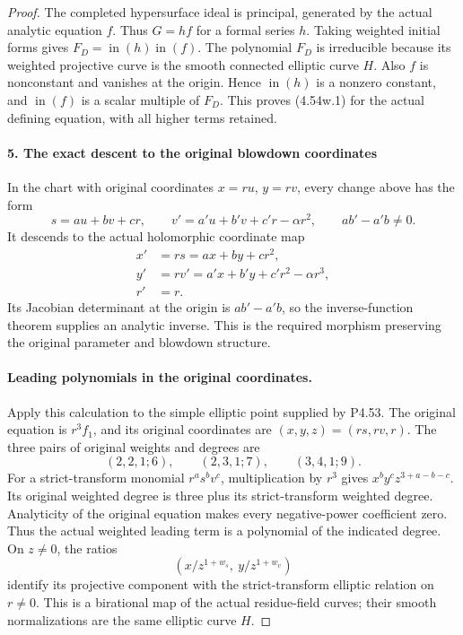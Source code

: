 \begin{proof}
The completed hypersurface ideal is principal, generated by
the actual analytic equation \(f\). Thus \(G=h f\) for
a formal series \(h\). Taking weighted initial forms gives
\(F_D=\operatorname{in}(h)\operatorname{in}(f)\).
The polynomial \(F_D\) is irreducible because its weighted
projective curve is the smooth connected elliptic curve
\(H\). Also \(f\) is nonconstant and vanishes at the
origin. Hence \(\operatorname{in}(h)\) is a nonzero
constant, and \(\operatorname{in}(f)\) is a scalar multiple
of \(F_D\). This proves (4.54w.1) for the actual defining
equation, with all higher terms retained.

\paragraph{5. The exact descent to the original blowdown coordinates}

In the chart with original coordinates
\(x=r u\), \(y=r v\), every change above has the form
\[
 s=a u+b v+c r,\qquad
 v'=a'u+b'v+c'r-\alpha r^2,
 \qquad ab'-a'b\ne0.
\]
It descends to the actual holomorphic coordinate map
\[
 \begin{aligned}
 x'&=r s=a x+b y+c r^2,\\
 y'&=r v'=a'x+b'y+c'r^2-\alpha r^3,\\
 r'&=r.
 \end{aligned}                                        \tag{4.54w.5}
\]
Its Jacobian determinant at the origin is \(ab'-a'b\),
so the inverse-function theorem supplies an analytic inverse.
This is the required morphism preserving the original
parameter and blowdown structure.


\paragraph{Leading polynomials in the original coordinates.}
Apply this calculation to the simple elliptic point supplied
by P4.53. The original equation is $r^3f_1$, and its original
coordinates are $(x,y,z)=(rs,rv,r)$. The three pairs of
original weights and degrees are
\[
 (2,2,1;6),\qquad (2,3,1;7),\qquad (3,4,1;9).
\]
For a strict-transform monomial $r^as^bv^c$, multiplication
by $r^3$ gives $x^by^cz^{3+a-b-c}$. Its original weighted
degree is three plus its strict-transform weighted degree.
Analyticity of the original equation makes every
negative-power coefficient zero. Thus the actual weighted
leading term is a polynomial of the indicated degree.
On $z\ne0$, the ratios
\[
     \left(x/z^{1+w_s},\ y/z^{1+w_v}\right)
\]
identify its projective component with the strict-transform
elliptic relation on $r\ne0$. This is a birational map
of the actual residue-field curves; their smooth
normalizations are the same elliptic curve $H$.


\end{proof}
